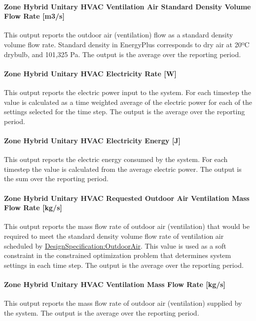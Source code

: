 \paragraph{Zone Hybrid Unitary HVAC Ventilation Air Standard Density Volume Flow Rate [m3/s]}
This output reports the outdoor air (ventilation) flow as a standard density volume flow rate. Standard density in EnergyPlus corresponds to dry air at 20º\si{C} drybulb, and 101,325 Pa. The output is the average over the reporting period.

\paragraph{Zone Hybrid Unitary HVAC Electricity Rate [W]}
This output reports the electric power input to the system. For each timestep the value is calculated as a time weighted average of the electric power for each of the settings selected for the time step. The output is the average over the reporting period.

\paragraph{Zone Hybrid Unitary HVAC Electricity Energy [J]}
This output reports the electric energy consumed by the system. For each timestep the value is calculated from the average electric power. The output is the sum over the reporting period.

\paragraph{Zone Hybrid Unitary HVAC Requested Outdoor Air Ventilation Mass Flow Rate [kg/s]}
This output reports the mass flow rate of outdoor air (ventilation) that would be required to meet the standard density volume flow rate of ventilation air scheduled by \hyperref[designspecificationoutdoorair]{DesignSpecification:OutdoorAir}. This value is used as a soft constraint in the constrained optimization problem that determines system settings in each time step. The output is the average over the reporting period.

\paragraph{Zone Hybrid Unitary HVAC Ventilation Mass Flow Rate [kg/s]}
This output reports the mass flow rate of outdoor air (ventilation) supplied by the system. The output is the average over the reporting period.

